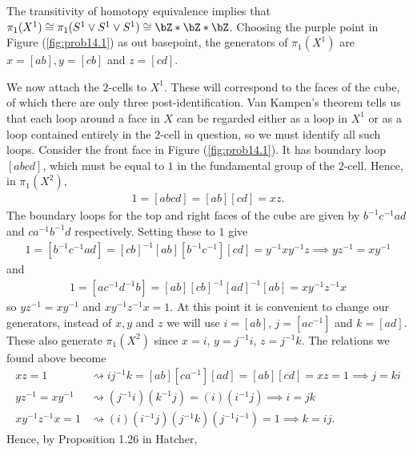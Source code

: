 \begin{homework}[e]
\begin{prf}
\begin{center}
      \label{fig:prob14.2}
    \end{center}
    The transitivity of homotopy equivalence implies that $\pi_1(X^1) \cong \pi_1(S^1\vee S^1\vee S^1) \cong \bZ\ast \bZ\ast \bZ$. Choosing the purple point in Figure (\ref{fig:prob14.1}) as out basepoint, the generators of $\pi_1(X^1)$ are $x = [ab], y = [cb]$ and $z = [cd]$.

    We now attach the $2$-cells to $X^1$. These will correspond to the faces of the cube, of which there are only three post-identification. Van Kampen's theorem tells us that each loop around a face in $X$ can be regarded either as a loop in $X^1$ or as a loop contained entirely in the $2$-cell in question, so we must identify all such loops. Consider the front face in Figure (\ref{fig:prob14.1}). It has boundary loop $[abcd]$, which must be equal to $1$ in the fundamental group of the $2$-cell. Hence, in $\pi_1(X^2)$,
    \begin{align*}
      1 = [abcd] = [ab][cd] = xz.
    \end{align*}
    The boundary loops for the top and right faces of the cube are given by $b^{-1}c^{-1}ad$ and $ca^{-1}b^{-1}d$ respectively. Setting these to $1$ give
    \begin{align*}
      1 = [b^{-1}c^{-1}ad] = [cb]^{-1}[ab][b^{-1}c^{-1}][cd] = y^{-1}xy^{-1}z \implies yz^{-1} = xy^{-1}
    \end{align*}
    and
    \begin{align*}
      1 = [ac^{-1}d^{-1}b] = [ab][cb]^{-1}[ad]^{-1}[ab] = xy^{-1}z^{-1}x
    \end{align*}
    so $yz^{-1} = xy^{-1}$ and $xy^{-1}z^{-1}x = 1$. At this point it is convenient to change our generators, instead of $x,y$ and $z$ we will use $i = [ab]$, $j = [ac^{-1}]$ and $k = [ad]$. These also generate $\pi_1(X^2)$ since
    $x = i$, $y = j^{-1}i$, $z = j^{-1}k$. The relations we found above become
    \begin{align*}
      xz = 1 &\rightsquigarrow ij^{-1}k = [ab][ca^{-1}][ad] = [ab][cd] = xz = 1 \implies j = ki\\
      yz^{-1} = xy^{-1} &\rightsquigarrow (j^{-1}i)(k^{-1}j) = (i)(i^{-1}j) \implies i = jk \\
      xy^{-1}z^{-1}x = 1 &\rightsquigarrow  (i)(i^{-1}j)(j^{-1}k)(j^{-1}i^{-1}) = 1 \implies k = ij.
    \end{align*}
    Hence, by Proposition 1.26 in Hatcher,
    \begin{align*}

\end{align*}
\end{prf}
\end{homework}
